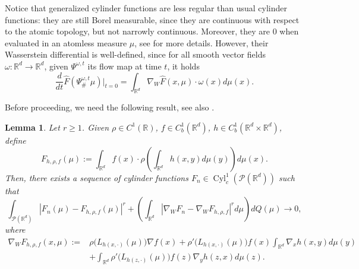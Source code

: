 \documentclass[10pt,leqno]{amsart}
\numberwithin{equation}{section}
\newtheorem{lemma}[teorema]{Lemma}
\newcommand{\R}{\mathbb{R}}
\newcommand{\Q}{\mathbb{Q}}
\newcommand{\PP}{\mathcal{P}}
\renewcommand{\Q}{Q}
\begin{document}
Notice that generalized cylinder functions are less regular than usual cylinder functions: they are still Borel measurable, since they are continuous with respect to the atomic topology, but not narrowly continuous. Moreover, they are $0$ when evaluated in an atomless measure $\mu$, see \cite[Proposition 3.8]{delloschiavo2024massive} for more details. However, their Wasserstein differential is well-defined, since for all smooth vector fields $\omega:\R^d \to \R^d$, given $\Psi^{\omega,t}$ its flow map at time $t$, it holds
\[\frac{d}{dt} \hat{F}(\Psi^{\omega,t}_\#\mu) |_{t=0}= \int_{\R^d} \nabla_W \hat{F}(x,\mu) \cdot \omega(x) d\mu(x).\]


\noindent Before proceeding, we need the following result, see also \cite[Lemma 7.19]{dello2022dirichlet}.

\begin{lemma}\label{interaction cyl function}
    Let $r\geq 1$. Given $\rho\in C^1(\R)$, $f\in C^1_b(\R^d)$, $h\in C^1_b(\R^d\times \R^d)$, define
    \begin{equation}\label{eq: interacting cyl functions} 
    F_{h,\rho,f}(\mu) := \int_{\R^d} f(x) \cdot \rho \left( \int_{\R^d} h(x,y) d\mu(y) \right) d\mu(x). 
    \end{equation}
    Then, there exists a sequence of cylinder functions $F_n\in \operatorname{Cyl}_c^1(\PP(\R^d))$ such that 
    \begin{equation}\label{appr by cyl of F_h,rho,f}
        \int_{\PP(\R^d)} |F_n(\mu) - F_{h,\rho,f}(\mu)|^r + \left(\int_{\R^d} |\nabla_W F_n - \nabla_W F_{h,\rho,f}|^r d\mu\right) d\Q(\mu) \to 0,
    \end{equation}
    where 
    \begin{equation}
    \begin{aligned}
        \nabla_W F_{h,\rho,f}(x,\mu) := & \rho\big(L_{h(x,\cdot)}(\mu)\big)\nabla f(x) + \rho'\big(L_{h(x,\cdot)}(\mu)\big)f(x) \int_{\R^d} \nabla_xh(x,y)d\mu(y) 
        \\
        & + \int_{\R^d} \rho'\big(L_{h(z,\cdot)}(\mu)\big) f(z) \nabla_y h(z,x) d\mu(z).
    \end{aligned}
    \end{equation}
\end{lemma}
\end{document}
